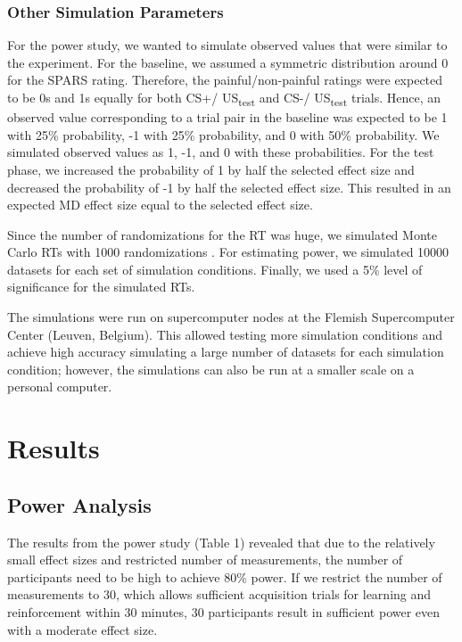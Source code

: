 \documentclass{article}
\begin{document}
\subsubsection{Other Simulation Parameters}

For the power study, we wanted to simulate observed values that were similar to the experiment. For the baseline, we assumed a symmetric distribution around 0 for the SPARS rating. Therefore, the painful/non-painful ratings were expected to be 0s and 1s equally for both CS+/ US\textsubscript{test} and CS-/ US\textsubscript{test} trials. Hence, an observed value corresponding to a trial pair in the baseline was expected to be 1 with 25\% probability, -1 with 25\% probability, and 0 with 50\% probability. We simulated observed values as 1, -1, and 0 with these probabilities. For the test phase, we increased the probability of 1 by half the selected effect size and decreased the probability of -1 by half the selected effect size. This resulted in an expected MD effect size equal to the selected effect size. 

Since the number of randomizations for the RT was huge, we simulated Monte Carlo RTs with 1000 randomizations \textcite{Edgington1969}. For estimating power, we simulated 10000 datasets for each set of simulation conditions. Finally, we used a 5\% level of significance for the simulated RTs.

The simulations were run on supercomputer nodes at the Flemish Supercomputer Center (Leuven, Belgium). This allowed testing more simulation conditions and achieve high accuracy simulating a large number of datasets for each simulation condition; however, the simulations can also be run at a smaller scale on a personal computer. 

\section{Results}

\subsection{Power Analysis}

The results from the power study (Table 1) revealed that due to the relatively small effect sizes and restricted number of measurements, the number of participants need to be high to achieve 80\% power. If we restrict the number of measurements to 30, which allows sufficient acquisition trials for learning and reinforcement within 30 minutes, 30 participants result in sufficient power even with a moderate effect size. 
\end{document}

